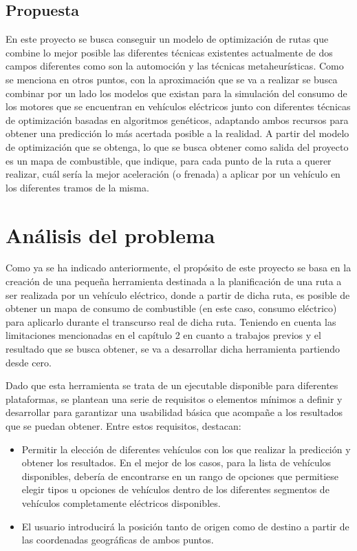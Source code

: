 \documentclass[11pt,spanish,listoffigures,listoftables]{tfgetsinf}
\begin{document}
\section{Propuesta}
En este proyecto se busca conseguir un modelo de optimización de rutas que combine lo mejor posible las diferentes técnicas existentes actualmente de dos campos diferentes como son la automoción y las técnicas metaheurísticas. Como se menciona en otros puntos, con la aproximación que se va a realizar se busca combinar por un lado los modelos que existan para la simulación del consumo de los motores que se encuentran en vehículos eléctricos junto con diferentes técnicas de optimización basadas en algoritmos genéticos, adaptando ambos recursos para obtener una predicción lo más acertada posible a la realidad. A partir del modelo de optimización que se obtenga, lo que se busca obtener como salida del proyecto es un mapa de combustible, que indique, para cada punto de la ruta a querer realizar, cuál sería la mejor aceleración (o frenada) a aplicar por un vehículo en los diferentes tramos de la misma.

\chapter{Análisis del problema}
\label{AnalisisProblema}
Como ya se ha indicado anteriormente, el propósito de este proyecto se basa en la creación de una pequeña herramienta destinada a la planificación de una ruta a ser realizada por un vehículo eléctrico, donde a partir de dicha ruta, es posible de obtener un mapa de consumo de combustible (en este caso, consumo eléctrico) para aplicarlo durante el transcurso real de dicha ruta. Teniendo en cuenta las limitaciones mencionadas en el capítulo 2 en cuanto a trabajos previos y el resultado que se busca obtener, se va a desarrollar dicha herramienta partiendo desde cero.

Dado que esta herramienta se trata de un ejecutable disponible para diferentes plataformas, se plantean una serie de requisitos o elementos mínimos a definir y desarrollar para garantizar una usabilidad básica que acompañe a los resultados que se puedan obtener. Entre estos requisitos, destacan:

\begin{itemize}
    \item Permitir la elección de diferentes vehículos con los que realizar la predicción y obtener los resultados. En el mejor de los casos, para la lista de vehículos disponibles, debería de encontrarse en un rango de opciones que permitiese elegir tipos u opciones de vehículos dentro de los diferentes segmentos de vehículos completamente eléctricos disponibles.
    \item El usuario introducirá la posición tanto de origen como de destino a partir de las coordenadas geográficas de ambos puntos.
\end{itemize}
\end{document}
